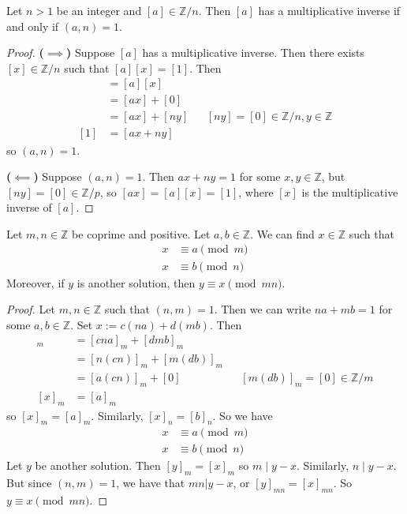 \documentclass [12pt] {article}
\newcommand{\Z}{\mathbb{Z}}
\newenvironment{theorem}[1]{\begin{tcolorbox}[title={Theorem #1},colback=green!5!white,colframe=black!75!green]}{\end{tcolorbox}}
\renewcommand{\bf}[1]{\textbf{{#1}}}
\begin{document}
\begin{theorem}{}
    Let $n > 1$ be an integer and $[a] \in \Z/n$. Then $[a]$ has a multiplicative inverse if and
    only if $(a, n) = 1$.
\end{theorem}
\begin{proof}
    \bf{($\bm{\implies}$)}
    Suppose $[a]$ has a multiplicative inverse. Then there exists $[x] \in \Z/n$ such that
    $[a][x] = [1]$. Then
    \begin{align*}
        [1] &= [a][x] \\
            &= [ax] + [0] \\
            &= [ax] + [ny] && [ny] = [0] \in \Z/n, y \in \Z \\
        [1] &= [ax + ny]
    \end{align*}
    so $(a, n) = 1$.
    \vspace{0.5em}

    \bf{($\bm{\impliedby}$)}
    Suppose $(a, n) = 1$. Then $ax + ny = 1$ for some $x, y \in \Z$, but $[ny] = [0] \in \Z/p$, so
    $[ax] = [a][x] = [1]$, where $[x]$ is the multiplicative inverse of $[a]$.
\end{proof}

\begin{theorem}{Chinese Remainder Theorem}
    Let $m, n \in \Z$ be coprime and positive. Let $a, b \in \Z$. We can find $x \in \Z$ such that
    \begin{align*}
        x &\equiv a \pmod{m} \\
        x &\equiv b \pmod{n}
    \end{align*}
    Moreover, if $y$ is another solution, then $y \equiv x \pmod{mn}$.
\end{theorem}
\begin{proof}
    Let $m, n \in \Z$ such that $(n, m) = 1$. Then we can write $na + mb = 1$ for some $a, b \in \Z$.
    Set $x := c(na) + d(mb)$. Then
    \begin{align*}
        [x]_m &= [cna]_m + [dmb]_m \\
              &= [n(cn)]_m + [m(db)]_m \\
              &= [a(cn)]_m + [0] && [m(db)]_m = [0] \in \Z/m \\
        [x]_m &= [a]_m
    \end{align*}
    so $[x]_m = [a]_m$. Similarly, $[x]_n = [b]_n$. So we have
    \begin{align*}
        x &\equiv a \pmod{m} \\
        x &\equiv b \pmod{n}
    \end{align*}
    Let $y$ be another solution. Then $[y]_m = [x]_m$ so $m \mid y - x$. Similarly, $n \mid y - x$.
    But since $(n, m) = 1$, we have that $mn | y - x$,
    or $[y]_{mn} = [x]_{mn}$. So $y \equiv x \pmod{mn}$.
\end{proof}
\end{document}
